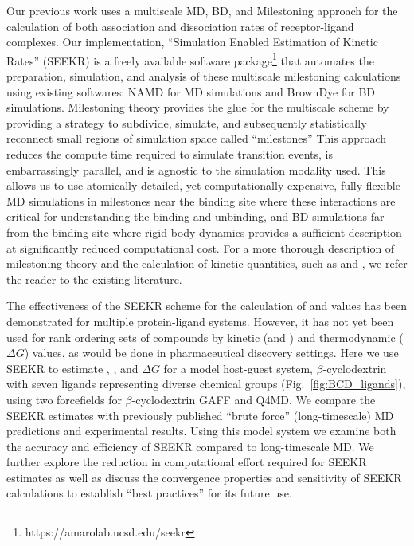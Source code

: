 \par Our previous work uses a multiscale MD, BD, and Milestoning approach for
the calculation of both association and dissociation rates of receptor-ligand
complexes\cite{Votapka2015,Votapka2017}. Our implementation, %
``Simulation Enabled Estimation
of Kinetic Rates'' (SEEKR)
is a freely available software package\footnote{https://amarolab.ucsd.edu/seekr} that automates the preparation,
simulation, and analysis of these multiscale milestoning calculations using
existing softwares: NAMD\cite{Phillips2005} for MD simulations and
BrownDye\cite{Huber2010} for BD simulations.
Milestoning theory
provides the glue for the multiscale scheme by providing a strategy to subdivide,
simulate, and subsequently statistically reconnect small regions of simulation
space called ``milestones''\cite{Faradjian2004,Shalloway2006,West2007,Vanden-Eijnden2008,
Vanden-Eijnden2009,Majek2010,Kirmizialtin2011,Cardenas2013,Cardenas2015,
Bello-Rivas2015,Votapka2015,Votapka2017,Elber2017} This approach reduces the compute time required to simulate transition events, is embarrassingly parallel, and is agnostic to the simulation modality used.
This allows us to use atomically detailed, yet computationally expensive,
fully flexible MD simulations in milestones near the binding site where these
interactions are critical for understanding the binding and unbinding, and BD
simulations far from the binding site where rigid body dynamics provides a
sufficient description at significantly reduced computational cost. For a more
thorough description of milestoning theory and the calculation of kinetic
quantities, such as \kon and \koff, we refer the reader to the existing
literature.\cite{Faradjian2004,Shalloway2006,West2007,Vanden-Eijnden2008,
Vanden-Eijnden2009,Majek2010,Kirmizialtin2011,Cardenas2013,Cardenas2015,
Bello-Rivas2015,Votapka2015,Votapka2017,Elber2017}

\par The effectiveness of the SEEKR scheme for the calculation of \kon and \koff
values has been demonstrated for multiple protein-ligand systems\cite{Votapka2015,Votapka2017}.
However, it has not yet been used for rank ordering sets of compounds by kinetic
(\kon and \koff) and thermodynamic ($\Delta G$) values, as would be done in
pharmaceutical discovery settings. Here we use SEEKR to estimate \kon , \koff, and $\Delta G$
for a model host-guest system, $\beta$-cyclodextrin with seven ligands
representing diverse chemical groups (Fig.~\ref{fig:BCD_ligands}), using two
forcefields for $\beta$-cyclodextrin  GAFF\cite{Wang2004,Wang2006} and Q4MD\cite{Cezard2011}. We compare the SEEKR estimates with previously
published ``brute force'' (long-timescale) MD predictions\cite{Tang2017} and experimental
results\cite{Fukahori2004,Fukahori2006,Nishikawa2002,Nishikawa2006,Rekharsky1998,Barros1998}.
Using this model system we examine both the accuracy and efficiency of SEEKR compared
to long-timescale MD. We further explore the reduction in computational effort
required for SEEKR estimates as well as discuss the convergence properties and
sensitivity of SEEKR calculations to establish ``best practices'' for its future
use.

